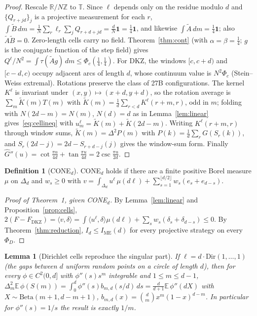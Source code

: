 \documentclass[11pt]{amsart}
\newtheorem{lemma}[theorem]{Lemma}
\theoremstyle{definition}
\newtheorem{definition}[theorem]{Definition}
\theoremstyle{remark}
\numberwithin{equation}{section}
\newcommand{\R}{\mathbb{R}}
\newcommand{\Z}{\mathbb{Z}}
\newcommand{\T}{\mathbb{T}}
\newcommand{\one}{\mathbf{1}}
\newcommand{\IME}{I_{\mathrm{ME}}}
\newcommand{\FD}{F_{\mathrm{DKZ}}}
\begin{document}
\begin{proof}
Rescale $\R/N\Z$ to $\T$. Since $\ell$ depends only on the residue modulo $d$ and $\{Q_{r+jd}\}_j$ is a projective
measurement for each $r$, $\int\tilde B\,dm=\frac1N\sum_r\ell_r\sum_jQ_{r+d+jd}=\frac dN\one=\frac14\one$, and likewise
$\int\tilde A\,dm=\frac14\one$; also $\tilde A\tilde B=0$. Zero-length cells carry no field. Theorem~\ref{thm:cont}
(with $\alpha=\beta=\frac14$; $g$ is the conjugate function of the step field) gives $Q^\ell/N^2=\int\tau(\tilde Ag)\,dm\le
\Phi_c(\frac14,\frac14)$. For DKZ, the windows $[c,c+d)$ and $[c-d,c)$ occupy adjacent arcs of length $d$, whose
continuum value is $N^2\Phi_c$ (Stein--Weiss extremal). Rotations preserve the class of 27B configurations. The kernel
$K^\ell$ is invariant under $(x,y)\mapsto(x+d,y+d)$, so the rotation average is
$\sum_m\tilde K(m)T(m)$ with $\tilde K(m)=\frac1d\sum_{r<d}K^\ell(r+m,r)$, odd in $m$; folding with
$N(2d-m)=N(m)$, $N(d)=d$ as in Lemma~\ref{lem:linear} gives~\eqref{eq:cellineq} with
$u^\ell_m=\tilde K(m)+\tilde K(2d-m)$. Writing $K^\ell(r+m,r)$ through window sums,
$\tilde K(m)=\Delta^2P(m)$ with $P(k)=\frac1d\sum_rG(S_r(k))$, and $S_r(2d-j)=2d-S_{r+d-j}(j)$ gives the window-sum
form. Finally $\hat G''(u)=\cot\frac{\pi u}{4d}+\tan\frac{\pi u}{4d}=2\csc\frac{\pi u}{2d}$.
\end{proof}

\begin{definition}[CONE$_d$]
CONE$_d$ holds if there are a finite positive Borel measure $\mu$ on $\Delta_d$ and $w_s\ge0$ with
$v=\int_{\Delta_d}u^\ell\,\mu(d\ell)+\sum_{s=1}^{\lfloor d/2\rfloor}w_s(e_s+e_{d-s})$.
\end{definition}

\begin{proof}[Proof of Theorem~1, given CONE$_d$]
By Lemma~\ref{lem:linear} and Proposition~\ref{prop:cells},
$2(F-\FD)=\langle v,\delta\rangle=\int\langle u^\ell,\delta\rangle\mu(d\ell)+\sum_sw_s(\delta_s+\delta_{d-s})\le0$.
By Theorem~\ref{thm:reduction}, $I_d\le\IME(d)$ for every projective strategy on every $\Phi_D$.
\end{proof}

\begin{lemma}[Dirichlet cells reproduce the singular part]\label{lem:dirichlet}
If $\ell=d\cdot\mathrm{Dir}(1,\dots,1)$ (the gaps between $d$ uniform random points on a circle of length $d$), then for
every $\phi\in C^2(0,d]$ with $\phi''(s)s^m$ integrable and $1\le m\le d-1$,
$\Delta^2_m\mathbb{E}\,\phi(S(m))=\int_0^d\phi''(s)b_{m,d}(s/d)\,ds=\frac{d}{d+1}\mathbb{E}\,\phi''(dX)$ with
$X\sim\mathrm{Beta}(m+1,d-m+1)$, $b_{m,d}(x)=\binom dmx^m(1-x)^{d-m}$. In particular for $\phi''(s)=1/s$ the result is
exactly $1/m$.
\end{lemma}
\end{document}
